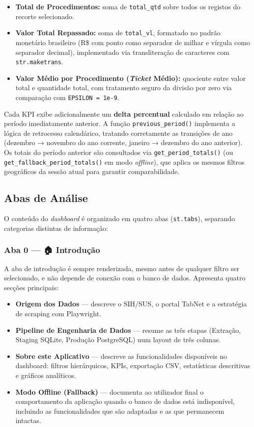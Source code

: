 \documentclass[12pt,a4paper]{report}
\begin{document}
\begin{itemize}
    \item \textbf{Total de Procedimentos:} soma de \texttt{total\_qtd} sobre todos os
    registos do recorte selecionado.
    \item \textbf{Valor Total Repassado:} soma de \texttt{total\_vl}, formatado no
    padrão monetário brasileiro (R\$ com ponto como separador de milhar e vírgula como
    separador decimal), implementado via transliteração de caracteres com
    \texttt{str.maketrans}.
    \item \textbf{Valor Médio por Procedimento (\textit{Ticket} Médio):} quociente
    entre valor total e quantidade total, com tratamento seguro da divisão por zero via
    comparação com \texttt{EPSILON = 1e-9}.
\end{itemize}

Cada KPI exibe adicionalmente um \textbf{delta percentual} calculado em relação ao
período imediatamente anterior. A função \texttt{previous\_period()} implementa a
lógica de retrocesso calendárico, tratando corretamente as transições de ano
(dezembro → novembro do ano corrente, janeiro → dezembro do ano anterior). Os totais
do período anterior são consultados via \texttt{get\_period\_totals()} (ou
\texttt{get\_fallback\_period\_totals()} em modo \textit{offline}), que aplica os mesmos
filtros geográficos da sessão atual para garantir comparabilidade.

\subsection{Abas de Análise}

O conteúdo do \textit{dashboard} é organizado em quatro abas
(\texttt{st.tabs}), separando categorias distintas de informação:

\subsubsection*{Aba 0 — 🏠 Introdução}

A aba de introdução é sempre renderizada, mesmo antes de qualquer filtro ser
selecionado, e não depende de conexão com o banco de dados. Apresenta quatro secções
principais:

\begin{itemize}
    \item \textbf{Origem dos Dados} — descreve o SIH/SUS, o portal TabNet e a
    estratégia de scraping com Playwright.
    \item \textbf{Pipeline de Engenharia de Dados} — resume as três etapas
    (Extração, Staging SQLite, Produção PostgreSQL) num layout de três colunas.
    \item \textbf{Sobre este Aplicativo} — descreve as funcionalidades disponíveis no
    dashboard: filtros hierárquicos, KPIs, exportação CSV, estatísticas descritivas e
    gráficos analíticos.
    \item \textbf{Modo Offline (Fallback)} — documenta ao utilizador final o
    comportamento da aplicação quando o banco de dados está indisponível, incluindo as
    funcionalidades que são adaptadas e as que permanecem intactas.
\end{itemize}
\end{document}
